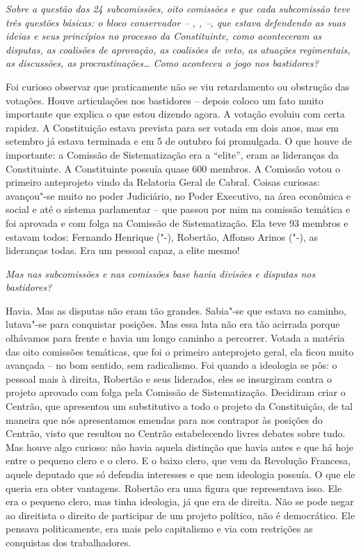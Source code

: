 \medskip

\noindent\emph{Sobre a questão das 24 subcomissões, oito comissões e que cada
subcomissão teve três questões básicas: o bloco conservador -- , ,
 --, que estava defendendo as suas ideias e seus princípios no
processo da Constituinte, como aconteceram as disputas, as coalisões de
aprovação, as coalisões de veto, as atuações regimentais, as discussões,
as procrastinações\ldots{} Como aconteceu o jogo nos bastidores?}

Foi curioso observar que praticamente não se viu
retardamento ou obstrução das votações. Houve articulações nos
bastidores -- depois coloco um fato muito importante que explica o que
estou dizendo agora. A votação evoluiu com certa rapidez. A Constituição
estava prevista para ser votada em dois anos, mas em setembro já estava
terminada e em 5 de outubro foi promulgada. O que houve de importante: a
Comissão de Sistematização era a ``elite'', eram as lideranças da
Constituinte. A Constituinte possuía quase 600 membros. A Comissão votou
o primeiro anteprojeto vindo da Relatoria Geral de Cabral. Coisas
curiosas: avançou"-se muito no poder Judiciário, no Poder Executivo, na
área econômica e social e até o sistema parlamentar -- que passou por
mim na comissão temática e foi aprovada e com folga na Comissão de
Sistematização. Ela teve 93 membros e estavam todos: Fernando Henrique
("-), Robertão, Affonso Arinos ("-), as lideranças todas. Era
um pessoal capaz, a elite mesmo!

\medskip

\noindent\emph{Mas nas subcomissões e nas comissões base havia divisões e
disputas nos bastidores?}

Havia. Mas as disputas não eram tão grandes. Sabia"-se
que estava no caminho, lutava"-se para conquistar posições. Mas essa luta
não era tão acirrada porque olhávamos para frente e havia um longo
caminho a percorrer. Votada a matéria das oito comissões temáticas, que
foi o primeiro anteprojeto geral, ela ficou muito avançada -- no bom
sentido, sem radicalismo. Foi quando a ideologia se pôs: o pessoal mais
à direita, Robertão e seus liderados, eles se insurgiram contra o
projeto aprovado com folga pela Comissão de Sistematização. Decidiram
criar o Centrão, que apresentou um substitutivo a todo o projeto da
Constituição, de tal maneira que nós apresentamos emendas para nos
contrapor às posições do Centrão, visto que resultou no Centrão
estabelecendo livres debates sobre tudo. Mas houve algo curioso: não
havia aquela distinção que havia antes e que há hoje entre o pequeno
clero e o clero. E o baixo clero, que vem da Revolução Francesa, aquele
deputado que só defendia interesses e que nem ideologia possuía. O que
ele queria era obter vantagens. Robertão era uma figura que representava
isso. Ele era o pequeno clero, mas tinha ideologia, já que era
de direita. Não se pode negar ao direitista o direito de participar de
um projeto político, não é democrático. Ele pensava politicamente, era
mais pelo capitalismo e via com restrições as conquistas dos
trabalhadores.

